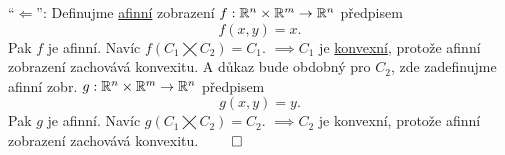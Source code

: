 \enquote{$\Leftarrow$}: Definujme \hyperref[sec:afin]{afinní} zobrazení $f : \mathbb{R}^n \times \mathbb{R}^m \rightarrow \mathbb{R}^n$ předpisem
\[ f(x,y) = x \text{.}\]
Pak $f$ je afinní. Navíc $f(C_1 \bigtimes C_2) = C_1$. $\implies C_1$ je \hyperref[sec:konvex]{konvexní}, protože afinní
zobrazení zachovává konvexitu.
A důkaz bude obdobný pro $C_2$, zde zadefinujme afinní zobr. $g : \mathbb{R}^n \times \mathbb{R}^m \rightarrow \mathbb{R}^n$ předpisem
\[ g(x,y) = y \text{.}\]
Pak $g$ je afinní. Navíc $g(C_1 \bigtimes C_2) = C_2$. $\implies C_2$ je konvexní, protože afinní zobrazení zachovává
konvexitu. $\qed$

